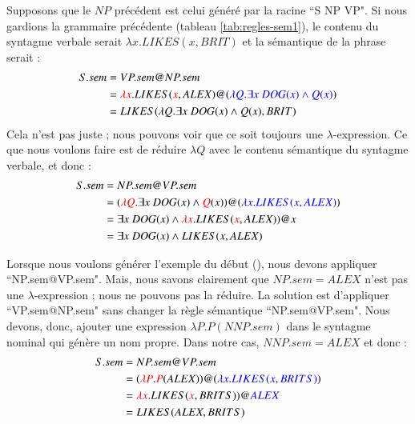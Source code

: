 \documentclass{KodeBook}
\begin{document}
Supposons que le $NP$ précédent est celui généré par la racine ``S \textrightarrow NP VP". 
Si nous gardions la grammaire précédente (tableau \ref{tab:regles-sem1}), le contenu du syntagme verbale serait $\lambda x.LIKES(x, BRIT)$ et la sémantique de la phrase serait :
\begin{align*}
S.sem & = VP.sem@NP.sem \\
& = \textcolor{red}{\lambda x}.LIKES(\textcolor{red}{x}, ALEX)@(\textcolor{blue}{\lambda Q.\exists x\ DOG(x) \wedge Q(x)})\\
& = LIKES(\lambda Q.\exists x\ DOG(x) \wedge Q(x), BRIT)
\end{align*}
Cela n'est pas juste ; nous pouvons voir que ce soit toujours une $\lambda $-expression. 
Ce que nous voulons faire est de réduire $\lambda Q$ avec le contenu sémantique du syntagme verbale, et donc :
\begin{align*}
S.sem & = NP.sem@VP.sem \\
& = (\textcolor{red}{\lambda Q}.\exists x\ DOG(x) \wedge \textcolor{red}{Q}(x))@(\textcolor{blue}{\lambda x.LIKES(x, ALEX)})\\
& = \exists x\ DOG(x) \wedge \textcolor{red}{\lambda x}.LIKES(\textcolor{red}{x}, ALEX))@x \\
& = \exists x\ DOG(x) \wedge LIKES(x, ALEX)
\end{align*}

Lorsque nous voulons générer l'exemple du début (), nous devons appliquer ``NP.sem@VP.sem". 
Mais, nous savons clairement que $NP.sem = ALEX$ n'est pas une $\lambda $-expression ; nous ne pouvons pas la réduire. 
La solution est d'appliquer ``VP.sem@NP.sem" sans changer la règle sémantique ``NP.sem@VP.sem". 
Nous devons, donc, ajouter une expression $\lambda P.P(NNP.sem)$ dans le syntagme nominal qui génère un nom propre. 
Dans notre cas, $NNP.sem = ALEX$ et donc :
\begin{align*}
S.sem & = NP.sem@VP.sem \\
& = (\textcolor{red}{\lambda P}.\textcolor{red}{P}(ALEX))@(\textcolor{blue}{\lambda x.LIKES(x, BRITS)})\\
& = \textcolor{red}{\lambda x}.LIKES(\textcolor{red}{x}, BRITS))@\textcolor{blue}{ALEX} \\
& = LIKES(ALEX, BRITS)
\end{align*}
\end{document}
